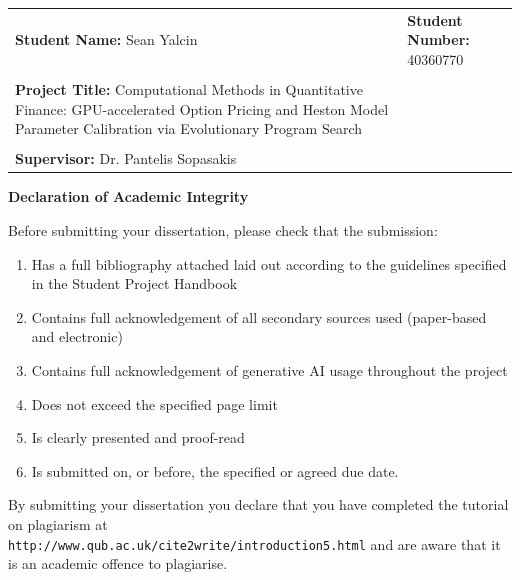 \documentclass[11pt]{report}
\begin{document}
\noindent
\begin{tabular}{p{7cm} p{7cm}}
\textbf{Student Name:} Sean Yalcin & \textbf{Student Number:} 40360770 \\
\\[0.8cm]
\textbf{Project Title:} Computational Methods in Quantitative Finance:
GPU-accelerated Option Pricing and Heston Model Parameter
Calibration via Evolutionary Program Search & \\
\\[0.8cm]
\textbf{Supervisor:} Dr. Pantelis Sopasakis & \\
\end{tabular}

\vspace{1.2cm}

\pagebreak
\begin{center}
{\large \textbf{Declaration of Academic Integrity}}
\end{center}

\vspace{0.5cm}

{\small Before submitting your dissertation, please check that the submission:}

\vspace{0.5cm}

\begin{enumerate}
\small
\item Has a full bibliography attached laid out according to the guidelines specified in the Student Project Handbook
\item Contains full acknowledgement of all secondary sources used (paper-based and electronic)
\item Contains full acknowledgement of generative AI usage throughout the project
\item Does not exceed the specified page limit
\item Is clearly presented and proof-read
\item Is submitted on, or before, the specified or agreed due date.
\end{enumerate}

\vspace{1cm}

{\small
By submitting your dissertation you declare that you have completed the tutorial on plagiarism at\\
\texttt{http://www.qub.ac.uk/cite2write/introduction5.html} and are aware that it is an academic offence to plagiarise.
}

\vspace{1.5cm}
\end{document}
